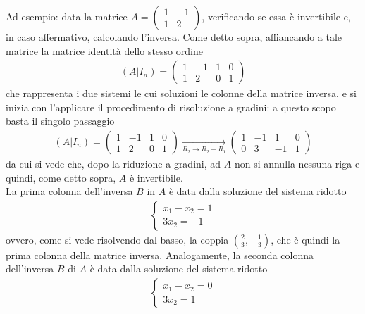 Ad esempio: data la matrice $A=
\begin{pmatrix}
  1 & -1\\
  1 & 2
\end{pmatrix}
$, verificando se essa è invertibile e, in caso affermativo,
calcolando l'inversa. Come detto sopra, affiancando a tale matrice
la matrice identità dello stesso ordine
\begin{eqnarray*}
  (A|I_n)=\left(
  \begin{array}{cc|cc}
    1 & -1 & 1 & 0\\
    1 &  2 & 0 & 1
  \end{array}
  \right)
\end{eqnarray*}
che rappresenta i due sistemi le cui soluzioni le colonne della
matrice inversa, e si inizia con l'applicare il procedimento di
risoluzione a gradini: a questo scopo basta il singolo passaggio
\begin{eqnarray}
  \label{eq:Compinveeproddimatrici13}
  (A|I_n)=\left(
  \begin{array}{cc|cc}
    1 & -1 & 1 & 0 \\
    1 & 2 & 0 & 1
  \end{array}\right) \underset{R_2\to R_2-R_1}{\to}\left(
  \begin{array}{cc|cc}
    1 & -1 & 1 & 0\\
    0 & 3 & -1 & 1
  \end{array}\right)
\end{eqnarray}
da cui si vede che, dopo la riduzione a gradini, ad $A$ non si
annulla nessuna riga e quindi, come detto sopra, $A$ è
invertibile.\\
La prima colonna dell'inversa $B$ in $A$ è data dalla soluzione del
sistema ridotto
\begin{eqnarray}
  \label{eq:Compinveeproddimatrici14}
  \begin{cases}
    x_1-x_2=1\\
    3x_2=-1
  \end{cases}
\end{eqnarray}
ovvero, come si vede risolvendo dal basso, la coppia
$\left(\frac{2}{3},-\frac{1}{3}\right)$, che è quindi la prima
colonna della matrice inversa. Analogamente, la seconda colonna
dell'inversa $B$ di $A$ è data dalla soluzione del sistema ridotto
\begin{eqnarray}
  \label{eq:Compinveeproddimatrici15}
  \begin{cases}
    x_1-x_2=0\\
    3x_2=1
  \end{cases}
\end{eqnarray}
